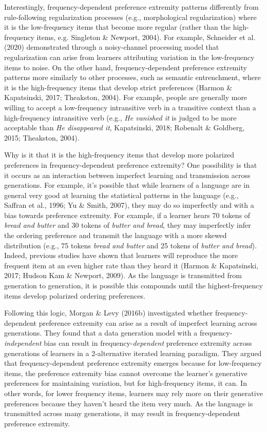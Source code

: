 \documentclass[10pt, letterpaper, hidelinks]{article}
\begin{document}
Interestingly, frequency-dependent preference extremity patterns
differently from rule-following regularization processes (e.g.,
morphological regularization) where it is the low-frequency items that
become more regular (rather than the high-frequency items, e.g.
Singleton \& Newport, 2004). For example, Schneider et al. (2020)
demonstrated through a noisy-channel processing model that
regularization can arise from learners attributing variation in the
low-frequency items to noise. On the other hand, frequency-dependent
preference extremity patterns more similarly to other processes, such as
semantic entrenchment, where it is the high-frequency items that develop
strict preferences (Harmon \& Kapatsinski, 2017; Theakston, 2004). For
example, people are generally more willing to accept a low-frequency
intransitive verb in a transitive context than a high-frequency
intransitive verb (e.g., \emph{He vanished it} is judged to be more
acceptable than \emph{He disappeared it}, Kapatsinski, 2018; Robenalt \&
Goldberg, 2015; Theakston, 2004).

Why is it that it is the high-frequency items that develop more
polarized preferences in frequency-dependent preference extremity? One
possibility is that it occurs as an interaction between imperfect
learning and transmission across generations. For example, it's possible
that while learners of a language are in general very good at learning
the statistical patterns in the language (e.g., Saffran et al., 1996; Yu
\& Smith, 2007), they may do so imperfectly and with a bias towards
preference extremity. For example, if a learner hears 70 tokens of
\emph{bread and butter} and 30 tokens of \emph{butter and bread}, they
may imperfectly infer the ordering preference and transmit the language
with a more skewed distribution (e.g., 75 tokens \emph{bread and butter}
and 25 tokens of \emph{butter and bread}). Indeed, previous studies have
shown that learners will reproduce the more frequent item at an even
higher rate than they heard it (Harmon \& Kapatsinski, 2017; Hudson Kam
\& Newport, 2009). As the language is transmitted from generation to
generation, it is possible this compounds until the highest-frequency
items develop polarized ordering preferences.

Following this logic, Morgan \& Levy (2016b) investigated whether
frequency-dependent preference extremity can arise as a result of
imperfect learning across generations. They found that a data generation
model with a frequency-\emph{independent} bias can result in
frequency-\emph{dependent} preference extremity across generations of
learners in a 2-alternative iterated learning paradigm. They argued that
frequency-dependent preference extremity emerges because for
low-frequency items, the preference extremity bias cannot overcome the
learner's generative preferences for maintaining variation, but for
high-frequency items, it can. In other words, for lower frequency items,
learners may rely more on their generative preferences because they
haven't heard the item very much. As the language is transmitted across
many generations, it may result in frequency-dependent preference
extremity.
\end{document}
